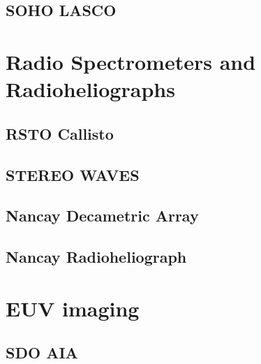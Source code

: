 \subsection{SOHO LASCO}\label{sec:23}




\section{Radio Spectrometers and Radioheliographs}\label{sec:3}

\subsection{RSTO Callisto}\label{sec:30}

\subsection{STEREO WAVES}\label{sec:31}

\subsection{Nancay Decametric Array}\label{sec:32}

\subsection{Nancay Radioheliograph}\label{sec:33}



\section{EUV imaging}\label{sec:4}

\subsection{SDO AIA}\label{sec:40}




